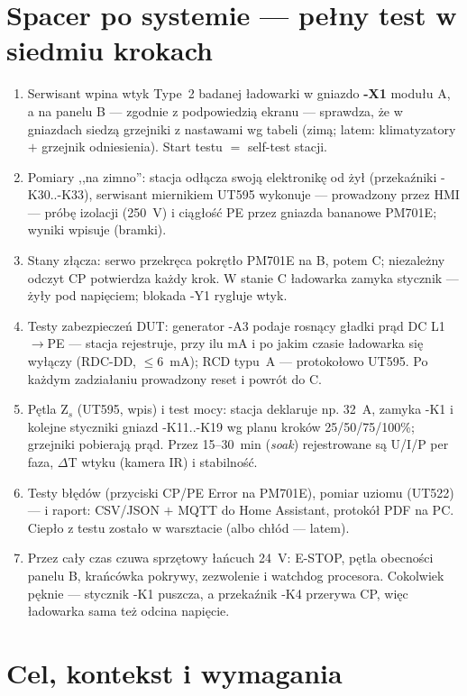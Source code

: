 \documentclass[11pt,a4paper]{article}
\begin{document}
\section{Spacer po systemie --- pełny test w siedmiu krokach}
\label{sec:spacer}
\begin{enumerate}
\item Serwisant wpina wtyk Type~2 badanej ładowarki w gniazdo \textbf{-X1} modułu A, a na panelu B
--- zgodnie z podpowiedzią ekranu --- sprawdza, że w gniazdach siedzą grzejniki z nastawami wg
tabeli (zimą; latem: klimatyzatory $+$ grzejnik odniesienia). Start testu $=$ self-test stacji.
\item Pomiary ,,na zimno'': stacja odłącza swoją elektronikę od żył (przekaźniki -K30..-K33),
serwisant miernikiem UT595 wykonuje --- prowadzony przez HMI --- próbę izolacji (250~V) i ciągłość
PE przez gniazda bananowe PM701E; wyniki wpisuje (bramki).
\item Stany złącza: serwo przekręca pokrętło PM701E na B, potem C; niezależny odczyt CP potwierdza
każdy krok. W stanie C ładowarka zamyka stycznik --- żyły pod napięciem; blokada -Y1 rygluje wtyk.
\item Testy zabezpieczeń DUT: generator -A3 podaje rosnący gładki prąd DC L1$\to$PE --- stacja
rejestruje, przy ilu mA i po jakim czasie ładowarka się wyłączy (RDC-DD, $\le$6~mA); RCD typu~A
--- protokołowo UT595. Po każdym zadziałaniu prowadzony reset i powrót do C.
\item Pętla Z$_s$ (UT595, wpis) i test mocy: stacja deklaruje np. 32~A, zamyka -K1 i kolejne
styczniki gniazd -K11..-K19 wg planu kroków 25/50/75/100\%; grzejniki pobierają prąd. Przez
15--30~min (\emph{soak}) rejestrowane są U/I/P per faza, $\Delta$T wtyku (kamera IR) i stabilność.
\item Testy błędów (przyciski CP/PE Error na PM701E), pomiar uziomu (UT522) --- i raport:
CSV/JSON $+$ MQTT do Home Assistant, protokół PDF na PC. Ciepło z testu zostało w warsztacie
(albo chłód --- latem).
\item Przez cały czas czuwa sprzętowy łańcuch 24~V: E-STOP, pętla obecności panelu B, krańcówka
pokrywy, zezwolenie i watchdog procesora. Cokolwiek pęknie --- stycznik -K1 puszcza, a przekaźnik
-K4 przerywa CP, więc ładowarka sama też odcina napięcie.
\end{enumerate}

\section{Cel, kontekst i wymagania}
\end{document}
